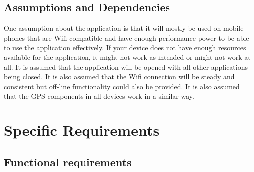 \documentclass[12pt]{article}
\begin{document}
	\subsection{Assumptions and Dependencies}
	One assumption about the application is that it will mostly be used on mobile phones that are Wifi compatible and have enough performance power to be able to use the application effectively. If your device does not have enough resources available for the application, it might not work as intended or might not work at all. It is assumed that the application will be opened with all other applications being closed. It is also assumed that the Wifi connection will be steady and consistent but off-line functionality could also be provided. It is also assumed that the GPS components in all devices work in a similar way.
	\section{Specific Requirements}

	\subsection{Functional requirements}
\end{document}

